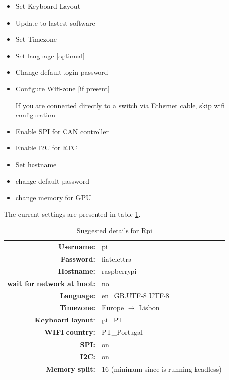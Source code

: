 \begin{itemize}
	\tightlist
	\item Set Keyboard Layout
	\item Update to lastest software
	\item Set Timezone
	\item Set language [optional]
	\item Change default login password
	\item Configure Wifi-zone [if present]\\
    \begin{mdframed}[backgroundcolor=red!20, roundcorner=10pt, innertopmargin=5pt, innerbottommargin=5pt, skipabove=0pt]
        If you are connected directly to a switch via Ethernet cable, skip wifi configuration.
    \end{mdframed}
	\item Enable \gls{SPI} for \gls{CAN} controller
	\item Enable \gls{I2C} for RTC
	\item Set hostname
	\item change default password
	\item change memory for GPU
\end{itemize}

The current settings are presented in table \ref{tab:suggested_config}. 

\begin{table}[h]
	\centering
	\begin{tabular}{rl}
		\toprule
		\textbf{Username:}& pi\\
		\textbf{Password:}& fiatelettra\\
		\textbf{Hostname:}& raspberrypi\\
		\textbf{wait for network at boot:}& no\\
		\textbf{Language:}& en\_GB.UTF-8 UTF-8\\
	    \textbf{Timezone:}& Europe $\rightarrow$ Lisbon\\
	    \textbf{Keyboard layout:}& pt\_PT\\
	    \textbf{WIFI country:}& PT\_Portugal\\
	    \textbf{SPI:}& on\\	
		\textbf{I2C:}& on\\
		\textbf{Memory split:}& 16 (minimum since is running headless)\\
		\bottomrule
	\end{tabular}
	\caption{Suggested details for \gls{Rpi}}
	\label{tab:suggested_config}
\end{table}

